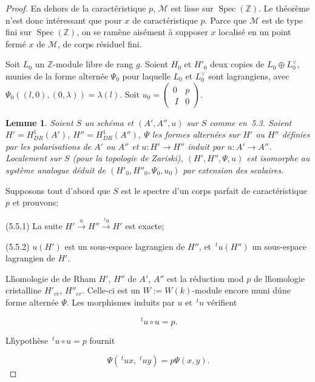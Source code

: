 \documentclass[11pt,a4paper]{article}
\theoremstyle{plain}
\newtheorem{lemma}[theorem]{Lemme}
\theoremstyle{definition}
\DeclareMathOperator{\Spec}{Spec}
\begin{document}
\begin{proof}
En dehors de la caract\'eristique $p$, $\mathscr{M}$ est lisse sur $\Spec(\mathbb{Z})$. Le th\'eor\`eme n'est
donc int\'eressant que pour $x$ de caract\'eristique $p$. Parce que $\mathscr{M}$ est de type fini
sur $\Spec(\mathbb{Z})$, on se ram\`ene ais\'ement \`a supposer $x$ localis\'e en un point ferm\'e $x$
de $\mathscr{M}$, de corps r\'esiduel fini.

Soit $L_0$ un $\mathbb{Z}$-module libre de rang $g$. Soient $H_0$ et $H'_0$ deux copies de
$L_0 \oplus L_0^\vee$, munies de la forme altern\'ee $\Psi_0$ pour laquelle $L_0$ et $L_0^\vee$ sont lagrangiens,
avec $\Psi_0((l,0), (0, \lambda)) = \lambda(l)$. Soit $u_0 = \begin{pmatrix} 0 & p \\\ I & 0 \end{pmatrix}$.

\begin{lemma}
Soient $S$ un sch\'ema et $(A', A'', u)$ sur $S$ comme en~5.3. Soient
$H' = H^1_{DR}(A')$, $H'' = H^1_{DR}(A'')$, $\Psi$ les formes altern\'ees sur $H'$ ou $H''$ d\'efinies par
les polarisations de $A'$ ou $A''$ et $u: H' \to H''$ induit par $u: A' \to A''$. Localement sur
$S$ (pour la topologie de Zariski), $(H', H'', \Psi, u)$ est isomorphe au syst\`eme analogue
d\'eduit de $(H'_0, H''_0, \Psi_0, u_0)$ par extension des scalaires.
\end{lemma}

Supposons tout d'abord que $S$ est le spectre d'un corps parfait de
caract\'eristique $p$ et prouvons:

(5.5.1) La suite $H' \xrightarrow{u} H'' \xrightarrow{\,\!^t u} H'$ est exacte;

(5.5.2) $u(H')$ est un sous-espace lagrangien de $H''$,
et $\,\!^t u(H'')$ un sous-espace lagrangien de $H'$.

L\'homologie de de Rham $H'$, $H''$ de $A'$, $A''$ est la r\'eduction mod $p$ de
l\'homologie cristalline $H'_{cr}$, $H''_{cr}$. Celle-ci est un $W := W(k)$-module encore muni
d\'une forme altern\'ee $\Psi$. Les morphismes induits par $u$ et $\,\!^t u$ v\'erifient

\begin{equation}
\,\!^t u \circ u = p.
\end{equation}

L\'hypoth\`ese $\,\!^t u \circ u = p$ fournit

\begin{equation}
\Psi(\,\!^t u x, \; \!^t u y) = p \Psi(x, y).
\end{equation}


\end{proof}
\end{document}
